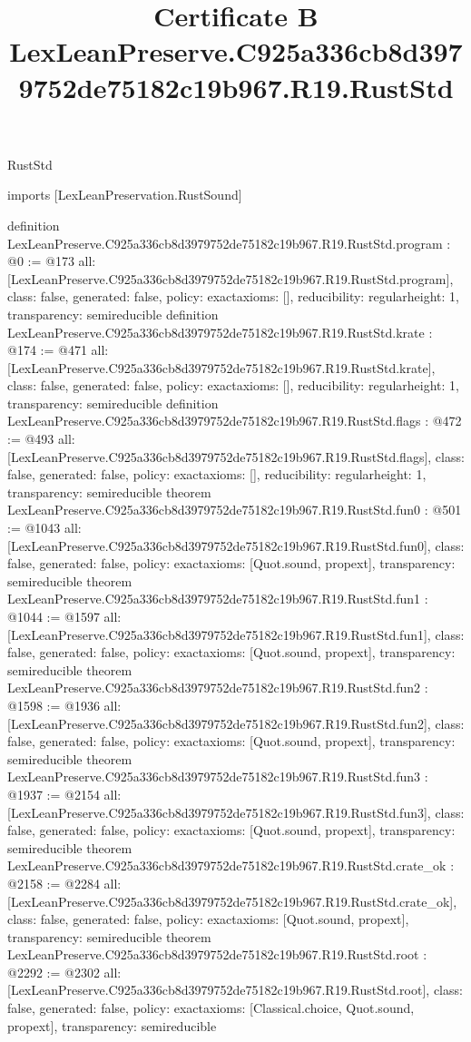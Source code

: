 \begin{lexlean}{RustStd}
\title{Certificate B LexLeanPreserve.C925a336cb8d3979752de75182c19b967.R19.RustStd}
\begin{coremodule}
imports [LexLeanPreservation.RustSound]

definition LexLeanPreserve.C925a336cb8d3979752de75182c19b967.R19.RustStd.program : @0 := @173 {
  all: [LexLeanPreserve.C925a336cb8d3979752de75182c19b967.R19.RustStd.program],
  class: false,
  generated: false,
  policy: exact{axioms: []},
  reducibility: regular{height: 1},
  transparency: semireducible
}
definition LexLeanPreserve.C925a336cb8d3979752de75182c19b967.R19.RustStd.krate : @174 := @471 {
  all: [LexLeanPreserve.C925a336cb8d3979752de75182c19b967.R19.RustStd.krate],
  class: false,
  generated: false,
  policy: exact{axioms: []},
  reducibility: regular{height: 1},
  transparency: semireducible
}
definition LexLeanPreserve.C925a336cb8d3979752de75182c19b967.R19.RustStd.flags : @472 := @493 {
  all: [LexLeanPreserve.C925a336cb8d3979752de75182c19b967.R19.RustStd.flags],
  class: false,
  generated: false,
  policy: exact{axioms: []},
  reducibility: regular{height: 1},
  transparency: semireducible
}
theorem LexLeanPreserve.C925a336cb8d3979752de75182c19b967.R19.RustStd.fun0 : @501 := @1043 {
  all: [LexLeanPreserve.C925a336cb8d3979752de75182c19b967.R19.RustStd.fun0],
  class: false,
  generated: false,
  policy: exact{axioms: [Quot.sound, propext]},
  transparency: semireducible
}
theorem LexLeanPreserve.C925a336cb8d3979752de75182c19b967.R19.RustStd.fun1 : @1044 := @1597 {
  all: [LexLeanPreserve.C925a336cb8d3979752de75182c19b967.R19.RustStd.fun1],
  class: false,
  generated: false,
  policy: exact{axioms: [Quot.sound, propext]},
  transparency: semireducible
}
theorem LexLeanPreserve.C925a336cb8d3979752de75182c19b967.R19.RustStd.fun2 : @1598 := @1936 {
  all: [LexLeanPreserve.C925a336cb8d3979752de75182c19b967.R19.RustStd.fun2],
  class: false,
  generated: false,
  policy: exact{axioms: [Quot.sound, propext]},
  transparency: semireducible
}
theorem LexLeanPreserve.C925a336cb8d3979752de75182c19b967.R19.RustStd.fun3 : @1937 := @2154 {
  all: [LexLeanPreserve.C925a336cb8d3979752de75182c19b967.R19.RustStd.fun3],
  class: false,
  generated: false,
  policy: exact{axioms: [Quot.sound, propext]},
  transparency: semireducible
}
theorem LexLeanPreserve.C925a336cb8d3979752de75182c19b967.R19.RustStd.crate_ok : @2158 := @2284 {
  all: [LexLeanPreserve.C925a336cb8d3979752de75182c19b967.R19.RustStd.crate_ok],
  class: false,
  generated: false,
  policy: exact{axioms: [Quot.sound, propext]},
  transparency: semireducible
}
theorem LexLeanPreserve.C925a336cb8d3979752de75182c19b967.R19.RustStd.root : @2292 := @2302 {
  all: [LexLeanPreserve.C925a336cb8d3979752de75182c19b967.R19.RustStd.root],
  class: false,
  generated: false,
  policy: exact{axioms: [Classical.choice, Quot.sound, propext]},
  transparency: semireducible
}


\end{coremodule}
\end{lexlean}
